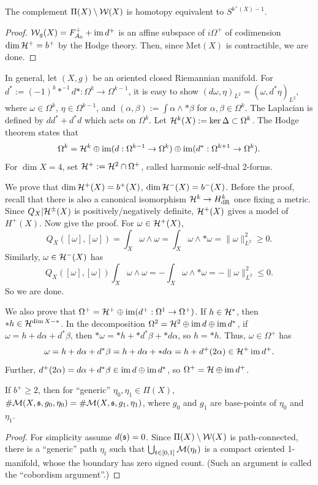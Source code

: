 \documentclass{../../../small}
\begin{document}
\begin{proposition*}
The complement $\Pi(X)\setminus\mathcal{W}(X)$ is homotopy equivalent to $S^{b^+(X)-1}$.
\end{proposition*}
\begin{proof}
$\mathcal{W}_g(X)=F_{A_0}^++\operatorname{im} d^+$ is an affine subspace of $i\Omega^+$ of codimension $\dim\mathcal{H}^+=b^+$ by the Hodge theory.
Then, since $\mathrm{Met}(X)$ is contractible, we are done.
\end{proof}

\begin{remark*}
In general, let $(X,g)$ be an oriented closed Riemannian manifold.
For $d^*:=(-1)^k*^{-1}d*:\Omega^k\to\Omega^{k-1}$, it is easy to show $(d\omega,\eta)_{L^2}=(\omega,d^*\eta)_{L^2}$, where $\omega\in\Omega^k$, $\eta\in\Omega^{k-1}$, and $(\alpha,\beta):=\int \alpha\wedge *\beta$ for $\alpha,\beta\in\Omega^k$.
The Laplacian is defined by $dd^*+d^*d$ which acts on $\Omega^k$.
Let $\mathcal{H}^k(X):=\ker\Delta\subset\Omega^k$.
The Hodge theorem states that
\[\Omega^k=\mathcal{H}^k\oplus\operatorname{im}(d:\Omega^{k-1}\to\Omega^k)\oplus\operatorname{im}(d^*:\Omega^{k+1}\to\Omega^k).\]
For $\dim X=4$, set $\mathcal{H}^+:=\mathcal{H}^2\cap\Omega^+$, called harmonic self-dual 2-forms.

We prove that $\dim\mathcal{H}^+(X)=b^+(X)$, $\dim\mathcal{H}^-(X)=b^-(X)$.
Before the proof, recall that there is also a canonical isomorphism $\mathcal{H}^k\to H_{\mathrm{dR}}^k$ once fixing a metric.
Since $Q_X|{\mathcal{H}^\pm(X)}$ is positively/negatively definite, $\mathcal{H}^+(X)$ gives a model of $H^+(X)$.
Now give the proof.
For $\omega\in\mathcal{H}^+(X)$,
\[Q_X([\omega],[\omega])=\int_X\omega\wedge\omega=\int_X\omega\wedge*\omega=\|\omega\|_{L^2}^2\ge0.\]
Similarly, $\omega\in\mathcal{H}^-(X)$ has
\[Q_X([\omega],[\omega])\int_X\omega\wedge\omega=-\int_X\omega\wedge*\omega=-\|\omega\|_{L^2}^2\le0.\]
So we are done.

We also prove that $\Omega^+=\mathcal{H}^+\oplus\operatorname{im}(d^+:\Omega^1\to\Omega^+)$.
If $h\in\mathcal{H}^*$, then $*h\in\mathcal{H}^{\dim X-*}$.
In the decomposition $\Omega^2=\mathcal{H}^2\oplus\operatorname{im} d\oplus\operatorname{im} d^*$, if $\omega=h+d\alpha+d^*\beta$, then $*\omega=*h+*d^*\beta+*d\alpha$, so $h=*h$.
Thus, $\omega\in\Omega^+$ has
\[\omega=h+d\alpha+d^*\beta=h+d\alpha+*d\alpha=h+d^+(2\alpha)\in\mathcal{H}^+\operatorname{im} d^+.\]
Further, $d^+(2\alpha)=d\alpha+d^*\beta\in\operatorname{im} d\oplus\operatorname{im} d^*$, so $\Omega^+=\mathcal{H}\oplus\operatorname{im} d^+$.
\end{remark*}


\begin{proposition*}
If $b^+\ge2$, then for ``generic'' $\eta_0,\eta_1\in\Pi(X)$, $\#\mathcal{M}(X,\mathfrak{s},g_0,\eta_0)=\#\mathcal{M}(X,\mathfrak{s},g_1,\eta_1)$, where $g_0$ and $g_1$ are base-points of $\eta_0$ and $\eta_1$.
\end{proposition*}
\begin{proof}
For simplicity assume $d(\mathfrak{s})=0$.
Since $\Pi(X)\setminus\mathcal{W}(X)$ is path-connected, there is a ``generic'' path $\eta_t$ such that $\bigcup_{t\in[0,1]}\mathcal{M}(\eta_t)$ is a compact oriented 1-manifold, whose the boundary has zero signed count.
(Such an argument is called the ``cobordism argument''.)
\end{proof}
\end{document}
